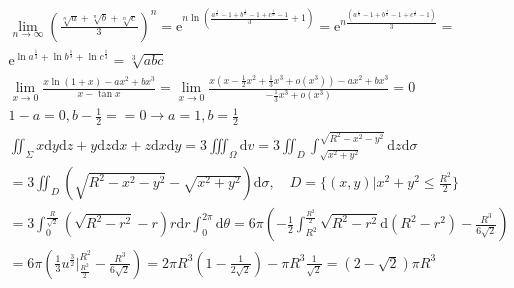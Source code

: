 \documentclass{article}
\begin{document}
\clearpage 
\begin{align*}
    \lim_{n \to \infty} \left(\frac{\sqrt[n]{a}+\sqrt[n]{b}+\sqrt[n]{c}}{3}\right)^{n} = \mathrm{e}^{n\ln\left(\frac{a^{\frac{1}{n}}-1+b^{\frac{1}{n}}-1+c^{\frac{1}{n}}-1}{3}+1\right)} = \mathrm{e}^{n\frac{(a^{\frac{1}{n}}-1+b^{\frac{1}{n}}-1+c^{\frac{1}{n}}-1)}{3}} = \\
    \mathrm{e}^{\ln a^{\frac{1}{3}}+\ln b^{\frac{1}{3}} + \ln c^{\frac{1}{3}}} = \sqrt[3]{abc}\\
    \lim_{x \to 0} \frac{x\ln(1+x)-ax^2+bx^3}{x-\tan x} = \lim_{x \to 0} \frac{x(x-\frac{1}{2}x^2+\frac{1}{3}x^3+o(x^3))-ax^2+bx^3}{-\frac{1}{3}x^3+o(x^3)}= 0\\
   1-a=0,b-\frac{1}{2}==0 \rightarrow a=1,b=\frac{1}{2} \\    
   \iint_{\Sigma} x\mathrm{d}y\mathrm{d}z+y\mathrm{d}z\mathrm{d}x+z\mathrm{d}x\mathrm{d}y = 3\iiint_{\Omega}\mathrm{d}v = 3\iint_{D} \int_{\sqrt{x^2+y^2}}^{\sqrt{R^2-x^2-y^2}} \mathrm{d}z \mathrm{d}\sigma \\
   = 3\iint_{D} (\sqrt{R^2-x^2-y^2}-\sqrt{x^2+y^2}) \mathrm{d}\sigma , \quad D = \{(x,y)|x^2+y^2 \le \frac{R^2}{2}\} \\
   = 3 \int_{0}^{\frac{R}{\sqrt{2}}} (\sqrt{R^2-r^2} -r )r\mathrm{d}r \int_{0}^{2\pi}\mathrm{d}\theta = 6\pi \left( -\frac{1}{2}\int_{R^2}^{\frac{R^2}{2}} \sqrt{R^2-r^2} \mathrm{d}(R^2-r^2) -\frac{R^{3}}{6\sqrt{2}}\right) \\ 
   = 6\pi \left( \frac{1}{3} u^{\frac{3}{2}}|_{\frac{R^2}{2}}^{R^2} -\frac{R^3}{6\sqrt{2}}\right) = 2\pi R^3\left(1-\frac{1}{2\sqrt{2}}\right)-\pi R^3\frac{1}{\sqrt{2}} = (2-\sqrt{2})\pi R^3 \\
\end{align*}
\end{document}
